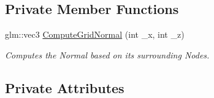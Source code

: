 \subsection*{Private Member Functions}
\begin{DoxyCompactItemize}
\item 
glm\+::vec3 \mbox{\hyperlink{classpiolot_1_1_terrain_a8228070fe11ba581ee8a8b8f9fe303d4}{Compute\+Grid\+Normal}} (int \+\_\+x, int \+\_\+z)
\begin{DoxyCompactList}\small\item\em Computes the Normal based on its surrounding Nodes. \end{DoxyCompactList}\end{DoxyCompactItemize}
\subsection*{Private Attributes}
